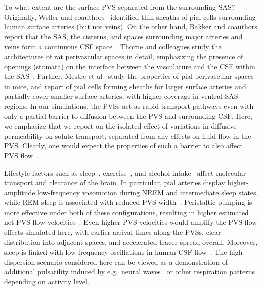 \documentclass[fleqn,10pt]{wlscirep}
\begin{document}
To what extent are the surface PVS separated from the surrounding SAS?
Originally, Weller and coauthors~\cite{zhang1990interrelationships,
  zhang1992directional, weller2005microscopic} identified thin sheaths
of pial cells surrounding human surface arteries (but not veins). On
the other hand, Bakker and coauthors report that the SAS, the
cisterns, and spaces surrounding major arteries and veins form a
continuous CSF space~\cite{bedussi2017paravascular}. Thorne and
colleagues study the architectures of rat perivascular spaces in
detail, emphasizing the presence of openings (stomata) on the
interface between the vasculature and the CSF within the
SAS~\cite{pizzo2018intrathecal, hannocks2018molecular}. Further,
Mestre et al~\cite{mestre2022periarteriolar} study the properties of
pial perivascular spaces in mice, and report of pial cells forming
sheaths for larger surface arteries and partially cover smaller
surface arteries, with higher coverage in ventral SAS regions. In our
simulations, the PVSs act as rapid transport pathways even with only a
partial barrier to diffusion between the PVS and surrounding
CSF. Here, we emphasize that we report on the isolated effect of
variations in diffusive permeability on solute transport, separated
from any effects on fluid flow in the PVS. Clearly, one would expect
the properties of such a barrier to also affect PVS
flow~\cite{romano2020peristaltic}.

Lifestyle factors such as sleep~\cite{xie2013sleep, miao2024brain,
  bojarskaite2023sleep, eide2021sleep, vinje2023human,
  hauglund2025norepinephrine, larsen2024sleep},
exercise~\cite{holstein2018voluntary, yildiz2022immediate}, and
alcohol intake~\cite{lundgaard2018beneficial} affect molecular
transport and clearance of the brain. In particular, pial arteries
display higher-amplitude low-frequency vasomotion during NREM and
intermediate sleep states, while REM sleep is associated with reduced
PVS width~\cite{bojarskaite2023sleep}. Peristaltic pumping is more
effective under both of these configurations, resulting in higher
estimated net PVS flow
velocities~\cite{gjerde2023directional}. Even-higher PVS velocities
would amplify the PVS flow effects simulated here, with earlier
arrival times along the PVSs, clear distribution into adjacent spaces,
and accelerated tracer spread overall. Moreover, sleep is linked with
low-frequency oscillations in human CSF
flow~\cite{fultz2019coupled}. The high dispersion scenario considered
here can be viewed as a demonstration of additional pulsatility
induced by e.g.~neural waves~\cite{fultz2019coupled,
  williams2023neural} or other respiration patterns depending on
activity level.
\end{document}
